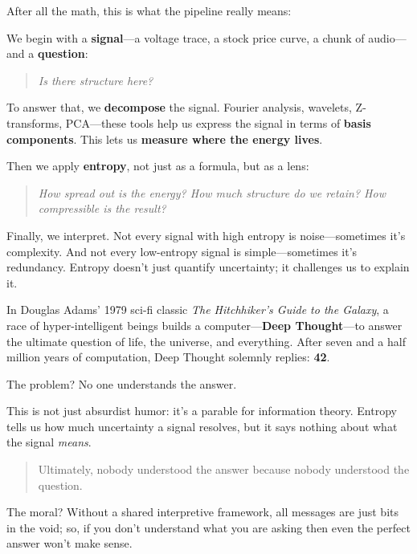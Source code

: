 After all the math, this is what the pipeline really means:

We begin with a \textbf{signal}—a voltage trace, a stock price curve, a chunk of audio—and a \textbf{question}:

\begin{quote}
\textit{Is there structure here?}
\end{quote}

To answer that, we \textbf{decompose} the signal. Fourier analysis, wavelets, Z-transforms, PCA—these tools help us express the signal in terms of \textbf{basis components}. This lets us \textbf{measure where the energy lives}.

Then we apply \textbf{entropy}, not just as a formula, but as a lens:

\begin{quote}
\textit{How spread out is the energy? How much structure do we retain? How compressible is the result?}
\end{quote}

Finally, we interpret. Not every signal with high entropy is noise—sometimes it’s complexity. And not every low-entropy signal is simple—sometimes it’s redundancy. Entropy doesn’t just quantify uncertainty; it challenges us to explain it.

\begin{tcolorbox}[title={\textbf{Historical Sidebar: 42, Entropy, and the Problem of Interpretation}}, colback=gray!5, colframe=black, fonttitle=\bfseries]

  In Douglas Adams’ 1979 sci-fi classic \textit{The Hitchhiker’s Guide to the Galaxy}, a race of hyper-intelligent beings builds a computer—\textbf{Deep Thought}—to answer the ultimate question of life, the universe, and everything. After seven and a half million years of computation, Deep Thought solemnly replies: \textbf{42}.

  \medskip
  
  The problem? No one understands the answer.

  \medskip
  
  This is not just absurdist humor: it’s a parable for information theory.  Entropy tells us how much uncertainty a signal resolves, but it says nothing about what the signal \textit{means}.
 
  \begin{quote}
  
  Ultimately, nobody understood the answer because nobody understood the question. 

  \end{quote}
  
  The moral? Without a shared interpretive framework, all messages are just bits in the void; so, if you don’t understand what you are asking then even the perfect answer won’t make sense.
  
\end{tcolorbox}
  
